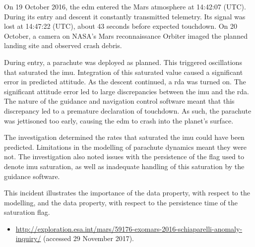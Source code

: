On 19 October 2016, the \gls{edm} entered the Mars atmosphere at 14:42:07 (UTC). During its entry and descent it constantly transmitted telemetry. Its signal was lost at 14:47:22 (UTC), about 43 seconds before expected touchdown. On 20 October, a camera on NASA's Mars reconnaissance Orbiter imaged the planned landing site and observed crash debris.

During entry, a parachute was deployed as planned. This triggered oscillations that saturated the \gls{imu}. Integration of this saturated value caused a significant error in predicted attitude. As the descent continued, a \gls{rda} was turned on. The significant attitude error led to large discrepancies between the \gls{imu} and the \gls{rda}. The nature of the guidance and navigation control software meant that this discrepancy led to a premature declaration of touchdown. As such, the parachute was jettisoned too early, causing the \gls{edm} to crash into the planet's surface.

The investigation determined the rates that saturated the \gls{imu} could have been predicted. Limitations in the modelling of parachute dynamics meant they were not. The investigation also noted issues with the persistence of the flag used to denote \gls{imu} saturation, as well as inadequate handling of this saturation by the guidance software.

This incident illustrates the importance of the  \gls{data property}, with respect to the modelling, and the  \gls{data property}, with respect to the persistence time of the saturation flag.

\begin{samepage}
\begin{itemize}
	\item \raggedright{\href{http://exploration.esa.int/mars/59176-exomars-2016-schiaparelli-anomaly-inquiry/}{http://exploration.esa.int/mars/59176-exomars-2016-schiaparelli-anomaly-inquiry/} (accessed 29 November 2017).}
\end{itemize}
\end{samepage}


